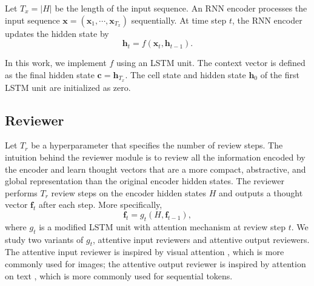 \documentclass{article}
\begin{document}
Let $T_x = |H|$ be the length of the input sequence. An RNN encoder processes the input sequence $\mathbf{x} = (\mathbf{x}_1, \cdots, \mathbf{x}_{T_x})$ sequentially. At time step $t$, the RNN encoder updates the hidden state by
\[\mathbf{h}_t = f(\mathbf{x}_t, \mathbf{h}_{t - 1}).\]

In this work, we implement $f$ using an LSTM unit. The context vector is defined as the final hidden state $\mathbf{c} = \mathbf{h}_{T_x}$. The cell state and hidden state $\mathbf{h}_0$ of the first LSTM unit are initialized as zero.


\subsection{Reviewer}

Let $T_r$ be a hyperparameter that specifies the number of review steps. The intuition behind the reviewer module is to review all the information encoded by the encoder and learn thought vectors that are a more compact, abstractive, and global representation than the original encoder hidden states. The reviewer performs $T_r$ review steps on the encoder hidden states $H$ and outputs a thought vector $\mathbf{f}_t$ after each step. More specifically,
\[
\mathbf{f}_t = g_t(H, \mathbf{f}_{t - 1}),
\]
where $g_t$ is a modified LSTM unit with attention mechanism at review step $t$. We study two variants of $g_t$, attentive input reviewers and attentive output reviewers. The attentive input reviewer is inspired by visual attention \cite{xu2015show}, which is more commonly used for images; the attentive output reviewer is inspired by attention on text \cite{bahdanau2014neural}, which is more commonly used for sequential tokens.
\end{document}
